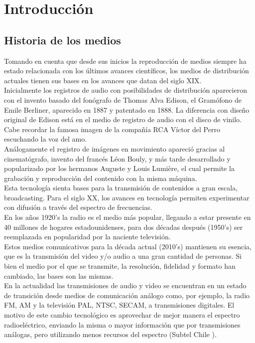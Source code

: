 \chapter{Introducción}
\section{Historia de los medios}
Tomando en cuenta que desde sus inicios la reproducción de medios siempre ha estado relacionada con los últimos avances científicos, los medios de distribución actuales tienen sus bases en los avances que datan  del siglo XIX.\\
Inicialmente los registros de audio con posibilidades de distribución aparecieron con el invento basado del fonógrafo de Thomas Alva Edison, el Gramófono de Emile Berliner, aparecido en 1887 y patentado en 1888. La diferencia con diseño original de Edison está en el medio de registro de audio con el disco de vinilo. Cabe recordar la famosa imagen de la compañía RCA Víctor del Perro escuchando la voz del amo.\\

Análogamente el registro de imágenes en movimiento apareció gracias al cinematógrafo, invento del francés Léon Bouly, y más tarde desarrollado y popularizado por los hermanos Auguste y Louis Lumière, el cual permite la grabación y reproducción del contenido con la misma máquina.\\

Esta tecnología sienta bases para la transmisión de contenidos a gran escala, broadcasting. Para el siglo XX, los avances en tecnología permiten experimentar con difusión a través del espectro de frecuencias.\\

 En los años 1920’s la radio es el medio más popular, llegando a estar presente en 40 millones de hogares estadounidenses, para dos décadas después (1950’s) ser reemplazada en popularidad por la naciente televisión.\\

	Estos medios comunicativos para la década actual (2010’s) mantienen su esencia, que es la transmisión del video y/o audio a una gran cantidad de personas. Si bien el medio por el que se transmite, la resolución, fidelidad y formato han cambiado, las bases son las mismas.\\
	
En la actualidad las transmisiones de audio y video se encuentran en un estado de transición desde medios de comunicación análogo como, por ejemplo, la radio FM, AM y la televisión PAL, NTSC, SECAM, a transmisiones digitales. El motivo de este cambio tecnológico es aprovechar de mejor manera el espectro radioeléctrico, enviando la misma o mayor información que por transmisiones análogas, pero utilizando menos recursos del espectro (Subtel Chile \cite{sota:subtel}).\\

